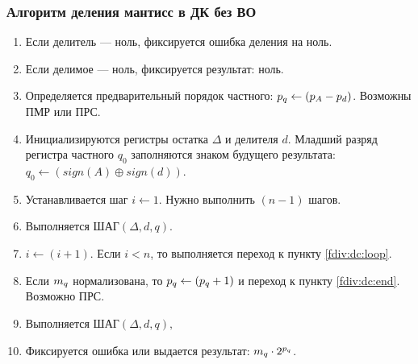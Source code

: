 \begin{frame}
    \frametitle{Алгоритм деления мантисс в ДК без ВО}

    \begin{enumerate}
        \item Если делитель --- ноль, фиксируется ошибка деления на ноль.
        
        \item Если делимое --- ноль, фиксируется результат: ноль.
        
        \item Определяется предварительный порядок частного: $p_{q}\gets(p_{A}-p_{d})$. Возможны ПМР или ПРС.
        
        \item \label{fdiv:dc:init} Инициализируются регистры остатка $\Delta$ и делителя $d$. Младший разряд регистра частного $q_0$ заполняются знаком будущего результата: $q_0\gets (sign(A)\oplus sign(d))$.

        \item Устанавливается шаг $i\gets 1$. Нужно выполнить $(n-1)$ шагов.
        
        \item \label{fdiv:dc:loop} Выполняется 
        \(
            \text{ШАГ}(\Delta,d,q).
        \)
        
        \item $i\gets (i + 1)$. Если $i < n$, то выполняется переход к пункту \ref{fdiv:dc:loop}.
        
        \item Если $m_{q}$ нормализована, то $p_{q}\gets(p_{q} + 1)$ и переход к пункту \ref{fdiv:dc:end}. Возможно ПРС.
        
        \item Выполняется 
        \(
            \text{ШАГ}(\Delta,d,q),
        \)
        
        \item \label{fdiv:dc:end} Фиксируется ошибка или выдается результат: $m_{q}\cdot {2}^{p_{q}}$. 
    \end{enumerate}
\end{frame}

